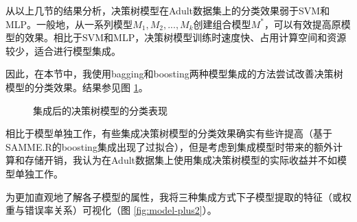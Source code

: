 \documentclass[12pt,a4paper]{article}
\theoremstyle{definition}
\begin{document}
{从以上几节的结果分析，决策树模型在Adult数据集上的分类效果弱于SVM和MLP。一般地，从一系列模型$M_1, M_2, ... , M_k$创建组合模型$M^*$，可以有效提高原模型的效果。相比于SVM和MLP，决策树模型训练时速度快、占用计算空间和资源较少，适合进行模型集成。

\vspace{0.01\linewidth}
因此，在本节中，我使用bagging和boosting两种模型集成的方法尝试改善决策树模型的分类效果。结果参见图 \ref{fig:model-plus}。

\begin{figure}[H]
	\centering
	\caption{集成后的决策树模型的分类表现}
	\label{fig:model-plus}
\end{figure}

相比于模型单独工作，有些集成决策树模型的分类效果确实有些许提高（基于SAMME.R的boosting集成出现了过拟合），但是考虑到集成模型时带来的额外计算和存储开销，我认为在Adult数据集上使用集成决策树模型的实际收益并不如模型单独工作。

\vspace{0.01\linewidth}
为更加直观地了解各子模型的属性，我将三种集成方式下子模型提取的特征（或权重与错误率关系）可视化（图 \ref{fig:model-plus2}）。

}
\end{document}
